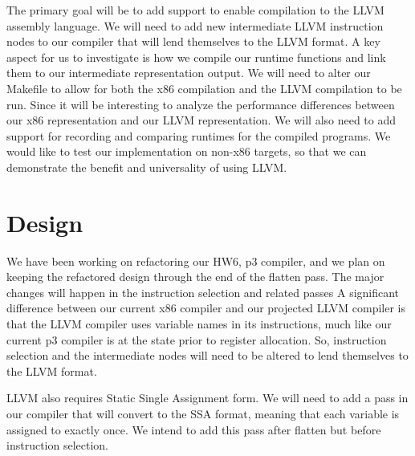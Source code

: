 \documentclass[11pt]{article}
\begin{document}

The primary goal will be to add support to enable compilation to the
LLVM assembly language.  We will need to add new intermediate LLVM
instruction nodes to our compiler that will lend themselves to the
LLVM format. A key aspect for us to investigate is how we compile our
runtime functions and link them to our intermediate representation
output.  We will need to alter our Makefile to allow for both the x86
compilation and the LLVM compilation to be run. Since it will be
interesting to analyze the performance differences between our x86
representation and our LLVM representation. We will also need to add
support for recording and comparing runtimes for the compiled
programs.  We would like to test our implementation on non-x86
targets, so that we can demonstrate the benefit and universality of
using LLVM.

\section{Design}


We have been working on refactoring our HW6, p3 compiler,
and we plan on keeping
the refactored design through the end of the flatten pass. The major
changes will happen in the instruction selection and related passes
A significant difference between our current x86
compiler and our projected LLVM compiler is that the LLVM compiler
uses variable names in its instructions, much like our current p3
compiler is at the state prior to register allocation. So, instruction
selection and the intermediate nodes will need to be altered to lend
themselves to the LLVM format.

LLVM also requires Static Single Assignment form.
We will need to add a pass in our compiler that will convert to the
SSA format, meaning that each variable is assigned to exactly once. We
intend to add this pass after flatten but before instruction
selection.
\end{document}
